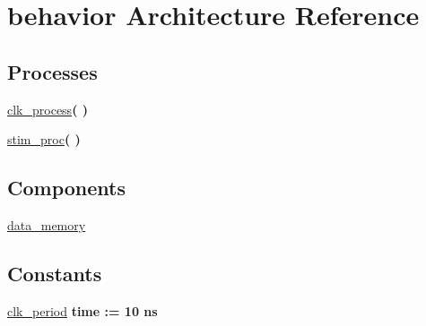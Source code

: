 \hypertarget{classdata__memory__tb_1_1behavior}{\section{behavior \-Architecture \-Reference}
\label{classdata__memory__tb_1_1behavior}
}
\*
\*
\subsection*{\-Processes}
 \begin{DoxyCompactItemize}
\item 
\hyperlink{classdata__memory__tb_1_1behavior_ac5bb218131b813f7908ec89476b31fca}{clk\-\_\-process}{\bfseries  (  )}
\item 
\hyperlink{classdata__memory__tb_1_1behavior_ad2efa6785cff833c341e27596b21aeb5}{stim\-\_\-proc}{\bfseries  (  )}
\end{DoxyCompactItemize}
\subsection*{\-Components}
 \begin{DoxyCompactItemize}
\item 
\hyperlink{classdata__memory__tb_1_1behavior_a422c295df4ca366bef414f65f01fd1b2}{data\-\_\-memory}  {\bfseries }  
\end{DoxyCompactItemize}
\subsection*{\-Constants}
 \begin{DoxyCompactItemize}
\item 
\hyperlink{classdata__memory__tb_1_1behavior_a25815afa4d614fdd5f49e43c04e1a946}{clk\-\_\-period} {\bfseries time  \-:=  10  ns } 
\end{DoxyCompactItemize}
